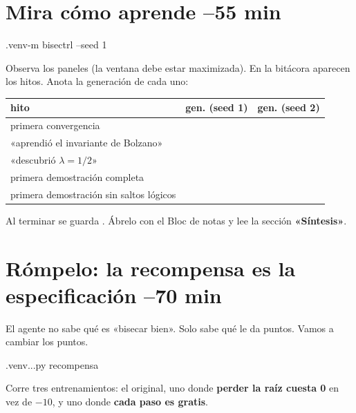 \section{Mira cómo aprende \hfill\small{}–55 min}
\begin{orden}
.venv\Scripts\python -m bisectrl --seed 1
\end{orden}
Observa los paneles (la ventana debe estar maximizada). En la bitácora aparecen los hitos. Anota la generación de cada uno:

\renewcommand{\arraystretch}{2.1}
\begin{tabularx}{\linewidth}{|X|c|c|}
\hline
\textbf{hito} & \textbf{gen. (seed 1)} & \textbf{gen. (seed 2)} \\
\hline
primera convergencia & \hspace{2.6cm} & \hspace{2.6cm} \\
\hline
«aprendió el invariante de Bolzano» & & \\
\hline
«descubrió $\lambda = 1/2$» & & \\
\hline
primera demostración completa & & \\
\hline
primera demostración sin saltos lógicos & & \\
\hline
\end{tabularx}
\renewcommand{\arraystretch}{1.25}

Al terminar se guarda . Ábrelo con el Bloc de notas y lee la sección \textbf{«Síntesis»}.

\begin{preguntas}
\end{preguntas}

\section{Rómpelo: la recompensa es la especificación \hfill\small{}–70 min}

El agente no sabe qué es «bisecar bien». Solo sabe qué le da puntos. Vamos a cambiar los puntos.
\begin{orden}
.venv\Scripts\python ..\docs\curso{}\experimentos.py recompensa
\end{orden}
Corre tres entrenamientos: el original, uno donde \textbf{perder la raíz cuesta 0} en vez de $-10$, y uno donde \textbf{cada paso es gratis}.

